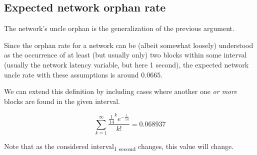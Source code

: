 \documentclass[11pt]{article}
\theoremstyle{plain}
\begin{document}
\subsection{\normalsize{Expected network orphan rate}}

The network's uncle orphan is the generalization of the previous argument.

Since the orphan rate for a network can be (albeit somewhat loosely)
understood as the occurrence of at least (but usually only) two blocks
within some interval (usually the network latency variable, but here 1 second),
the expected network uncle rate with these assumptions is around $0.0665$.

We can extend this definition by including cases where another one \emph{or more} blocks
are found in the given interval.

\begin{equation}
    \sum_{k=1}^{\infty}\frac{\frac{1}{14}^{k}e^{-\frac{1}{14}}}{k!} = 0.068937
\end{equation}

Note that as the considered interval\textsubscript{1 second} changes,
this value will change.
\end{document}
